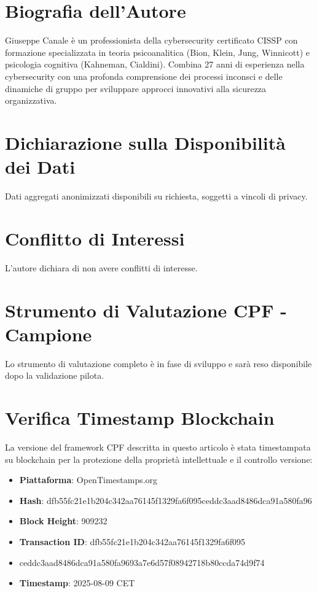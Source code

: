 \documentclass[11pt,a4paper]{article}
\begin{document}
\section*{Biografia dell'Autore}

Giuseppe Canale è un professionista della cybersecurity certificato CISSP con formazione specializzata in teoria psicoanalitica (Bion, Klein, Jung, Winnicott) e psicologia cognitiva (Kahneman, Cialdini). Combina 27 anni di esperienza nella cybersecurity con una profonda comprensione dei processi inconsci e delle dinamiche di gruppo per sviluppare approcci innovativi alla sicurezza organizzativa.

\section*{Dichiarazione sulla Disponibilità dei Dati}

Dati aggregati anonimizzati disponibili su richiesta, soggetti a vincoli di privacy.

\section*{Conflitto di Interessi}

L'autore dichiara di non avere conflitti di interesse.

\appendix

\section{Strumento di Valutazione CPF - Campione}
\label{app:instrument}

Lo strumento di valutazione completo è in fase di sviluppo e sarà reso disponibile dopo la validazione pilota.

\section{Verifica Timestamp Blockchain}
\label{app:blockchain}

La versione del framework CPF descritta in questo articolo è stata timestampata su blockchain per la protezione della proprietà intellettuale e il controllo versione:

\begin{itemize}
\item \textbf{Piattaforma}: OpenTimestamps.org
\item \textbf{Hash}: dfb55fc21e1b204c342aa76145f1329fa6f095ceddc3aad8486dca91a580fa96
\item \textbf{Block Height}: 909232
\item \textbf{Transaction ID}: dfb55fc21e1b204c342aa76145f1329fa6f095
\item ceddc3aad8486dca91a580fa9693a7e6d57f08942718b80ccda74d9f74
\item \textbf{Timestamp}: 2025-08-09 CET

\end{itemize}
\end{document}
